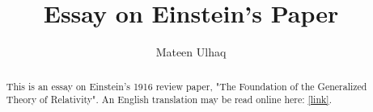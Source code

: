\documentclass[14pt]{extarticle}
\begin{document}
\author{Mateen Ulhaq}
\title{Essay on Einstein's Paper}
\maketitle




\begin{abstract}
This is an essay on Einstein's 1916 review paper, "The Foundation of the Generalized Theory of Relativity". An English translation may be read online here: \href{https://en.wikisource.org/wiki/The_Foundation_of_the_Generalised_Theory_of_Relativity}{[link]}.
\end{abstract}



\end{document}
